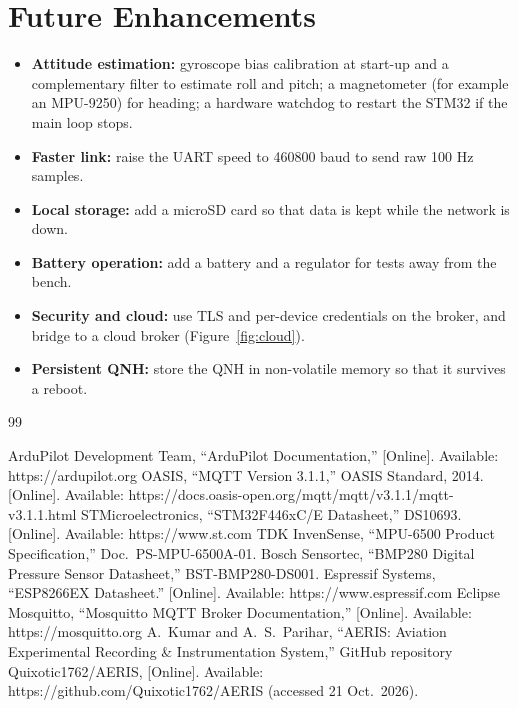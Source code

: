\documentclass[12pt,a4paper]{report}
\begin{document}
\section{Future Enhancements}
\begin{itemize}
\item \textbf{Attitude estimation:} gyroscope bias calibration at start-up and a complementary filter to estimate roll and pitch; a magnetometer (for example an MPU-9250) for heading; a hardware watchdog to restart the STM32 if the main loop stops.
\item \textbf{Faster link:} raise the UART speed to 460800 baud to send raw 100 Hz samples.
\item \textbf{Local storage:} add a microSD card so that data is kept while the network is down.
\item \textbf{Battery operation:} add a battery and a regulator for tests away from the bench.
\item \textbf{Security and cloud:} use TLS and per-device credentials on the broker, and bridge to a cloud broker (Figure~\ref{fig:cloud}).
\item \textbf{Persistent QNH:} store the QNH in non-volatile memory so that it survives a reboot.
\end{itemize}

\begin{thebibliography}{99}
 ArduPilot Development Team, ``ArduPilot Documentation,'' [Online]. Available: https://ardupilot.org
 OASIS, ``MQTT Version 3.1.1,'' OASIS Standard, 2014. [Online]. Available: https://docs.oasis-open.org/mqtt/mqtt/v3.1.1/mqtt-v3.1.1.html
 STMicroelectronics, ``STM32F446xC/E Datasheet,'' DS10693. [Online]. Available: https://www.st.com
 TDK InvenSense, ``MPU-6500 Product Specification,'' Doc.\ PS-MPU-6500A-01.
 Bosch Sensortec, ``BMP280 Digital Pressure Sensor Datasheet,'' BST-BMP280-DS001.
 Espressif Systems, ``ESP8266EX Datasheet.'' [Online]. Available: https://www.espressif.com
 Eclipse Mosquitto, ``Mosquitto MQTT Broker Documentation,'' [Online]. Available: https://mosquitto.org
 A.\ Kumar and A.\ S.\ Parihar, ``AERIS: Aviation Experimental Recording \& Instrumentation System,'' GitHub repository Quixotic1762/AERIS, [Online]. Available: https://github.com/Quixotic1762/AERIS (accessed 21 Oct.\ 2026).
\end{thebibliography}
\end{document}
